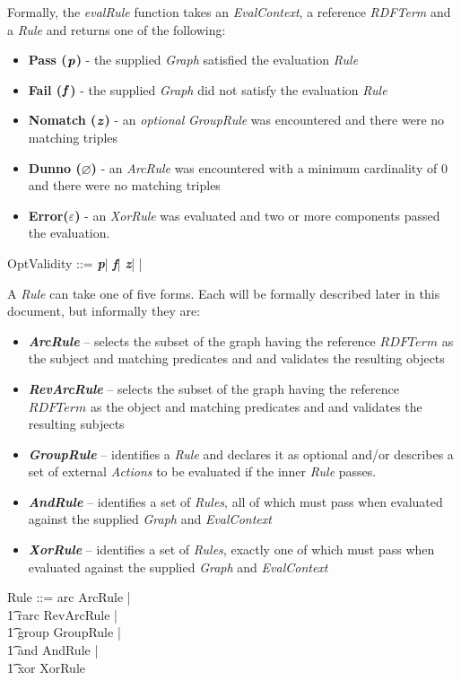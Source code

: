 \documentclass[fuzz]{llncs}
\def\pass{\textbf{\textit{p}}}
\def\fail{\textbf{\textit{f}}}
\def\dunno{\varnothing}
\def\error{\varepsilon}
\def\nomatch{\textbf{\textit{z}}}
\def\zc{\textit}
\begin{document}
Formally, the \zc{evalRule} function takes an \zc{EvalContext}, a reference \zc{RDFTerm} and a \zc{Rule} and returns one of the following:
\begin{itemize}
\item \textbf{Pass ($\pass$)} - the supplied \zc{Graph} satisfied the evaluation \zc{Rule}
\item \textbf{Fail ($\fail$)} - the supplied \zc{Graph} did not satisfy the evaluation \zc{Rule}
\item \textbf{Nomatch ($\nomatch$)} - an \zc{optional} \zc{GroupRule} was encountered and there were no matching triples
\item \textbf{Dunno ($\dunno$)} - an \zc{ArcRule} was encountered with a minimum cardinality of 0 and there were no matching triples
\item \textbf{Error($\error$)} - an \zc{XorRule} was evaluated and two or more components passed the evaluation.
\end{itemize}
\begin{zed}
OptValidity ::= \pass | \fail | \nomatch | \dunno | \error \\
\end{zed}
A  \zc{Rule} can take one of five forms. Each will be formally described later in this
document, but informally they are:
\begin{itemize}
\item \textbf{\zc{ArcRule}} -- selects the subset of the graph having the reference ${RDFTerm}$ as the subject and matching predicates and and validates the resulting objects
\item \textbf{\zc{RevArcRule}} -- selects the subset of the graph having the reference ${RDFTerm}$ as the object and matching predicates and and validates the resulting subjects 
\item \textbf{\zc{GroupRule}} -- identifies a \zc{Rule} and declares it as optional and/or
describes a set of external \zc{Actions} to be evaluated if the inner \zc{Rule} passes.
\item \textbf{\zc{AndRule}} -- identifies a set of \zc{Rules}, all of which must pass when
evaluated against the supplied \zc{Graph} and \zc{EvalContext}
\item \textbf{\zc{XorRule}} -- identifies a set of \zc{Rules}, exactly one of which must pass when
evaluated against the supplied \zc{Graph} and \zc{EvalContext}
\end{itemize}
\begin{zed}
Rule ::= arc \ldata ArcRule \rdata | \\
\t1 rarc \ldata RevArcRule \rdata | \\
\t1 group \ldata GroupRule \rdata | \\
\t1 and \ldata AndRule \rdata | \\
\t1 xor \ldata XorRule \rdata \\
\end{zed}
\end{document}
